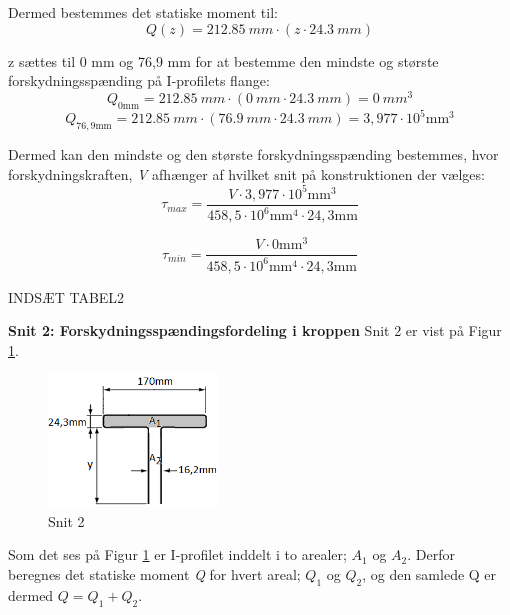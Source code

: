 Dermed bestemmes det statiske moment til:
\begin{equation}
Q(z) = \SI{212,85}{mm} \cdot (z \cdot \SI{24,3}{mm})
\end{equation}

z sættes til 0 mm og 76,9 mm for at bestemme den mindste og største forskydningsspænding på I-profilets flange:
\begin{equation}
Q_{0 \text{mm}} = \SI{212,85}{mm} \cdot (\SI{0}{mm} \cdot \SI{24,3}{mm}) = \SI{0}{mm^3}
\end{equation} 
\begin{equation}
	Q_{76,9 \text{mm}} = \SI{212,85}{mm} \cdot (\SI{76,9}{mm} \cdot \SI{24,3}{mm}) =  3,\!977 \cdot 10^5 \text{mm}^3 
\end{equation}

Dermed kan den mindste og den største forskydningsspænding bestemmes, hvor forskydningskraften, \textit{V} afhænger af hvilket snit på konstruktionen der vælges:
\begin{equation}
	\tau_{max} = \frac{V \cdot 3,977 \cdot 10^5 \text{mm}^3}{458,\!5 \cdot 10^6 \text{mm}^4 \cdot 24,\!3 \text{mm}}
\end{equation}

\begin{equation}
	\tau_{min} = \frac{V \cdot 0 \text{mm}^3}{458,\!5 \cdot 10^6 \text{mm}^4 \cdot 24,\!3 \text{mm}}
\end{equation}

INDSÆT TABEL2

\textbf{Snit 2: Forskydningsspændingsfordeling i kroppen}
\newline
Snit 2 er vist på Figur \ref{fig:snittoforskyd}. 

\begin{figure}[H]
	\centering
	\includegraphics[width=0.4\textwidth]{billeder/snittoforskydning.png}
	\caption{Snit 2}
	\label{fig:snittoforskyd}
\end{figure}

Som det ses på Figur \ref{fig:snittoforskyd} er I-profilet inddelt i to arealer; $A_1$ og $A_2$. Derfor beregnes det statiske moment \textit{Q} for hvert areal; $Q_1$ og $Q_2$, og den samlede Q er dermed $Q = Q_1 + Q_2$. 

